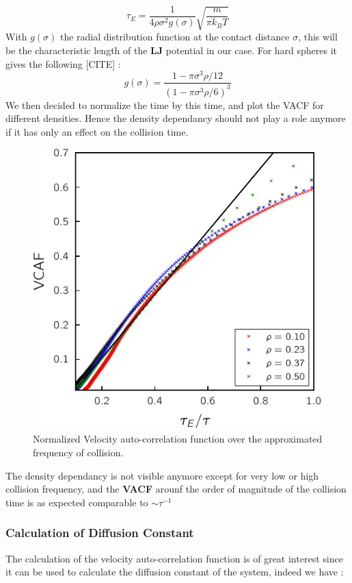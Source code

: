 \documentclass[ansiapaper]{report}
\begin{document}
\begin{multicols}{3}
 \begin{equation}
    \tau_E  = \frac{1}{4 \rho \sigma^2 g(\sigma)} \sqrt{\frac{m}{\pi k_B T}}
    \label{eq:mean_time_collision}
 \end{equation}
 With $g(\sigma)$ the radial distribution function at the contact distance $\sigma$, this will be the characteristic length of the \textbf{LJ} potential in our case. For hard spheres it gives the following [CITE] : $$ g(\sigma) = \frac{1 - \pi \sigma^3 \rho / 12}{(1 - \pi \sigma^3 \rho / 6)^3}$$
We then decided to normalize the time by this time, and plot the VACF for different densities. Hence the density dependancy should not play a role anymore if it has only an effect on the collision time.
 \begin{figure}[H]
    \begin{center}
        \includegraphics[width=1\linewidth]{figures/velocity_autocorrelation_density.pdf}
    \end{center}
    \caption{Normalized Velocity auto-correlation function over the approximated frequency of collision.}\label{fig:VCAF-thod}
\end{figure}
The density dependancy is not visible anymore except for very low or high collision frequency, and the \textbf{VACF} arounf the order of magnitude of the collision time is as expected comparable to $\sim \tau^{-1}$
\subsubsection{Calculation of Diffusion Constant}
The calculation of the velocity auto-correlation function is of great interest since it can be used to calculate the diffusion constant of the system, indeed we have : 


\end{multicols}
\end{document}
